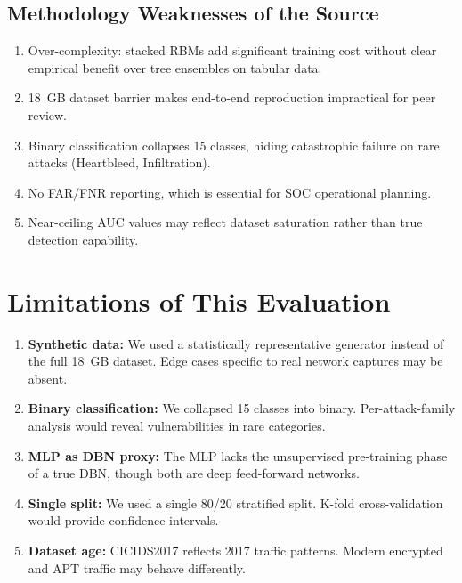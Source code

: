 \documentclass[11pt,a4paper]{article}
\begin{document}
\subsection{Methodology Weaknesses of the Source}
\begin{enumerate}[nosep]
    \item Over-complexity: stacked RBMs add significant training cost without clear empirical benefit over tree ensembles on tabular data.
    \item 18~GB dataset barrier makes end-to-end reproduction impractical for peer review.
    \item Binary classification collapses 15 classes, hiding catastrophic failure on rare attacks (Heartbleed, Infiltration).
    \item No FAR/FNR reporting, which is essential for SOC operational planning.
    \item Near-ceiling AUC values may reflect dataset saturation rather than true detection capability.
\end{enumerate}

\section{Limitations of This Evaluation}

\begin{enumerate}[nosep]
    \item \textbf{Synthetic data:} We used a statistically representative generator instead of the full 18~GB dataset. Edge cases specific to real network captures may be absent.
    \item \textbf{Binary classification:} We collapsed 15 classes into binary. Per-attack-family analysis would reveal vulnerabilities in rare categories.
    \item \textbf{MLP as DBN proxy:} The MLP lacks the unsupervised pre-training phase of a true DBN, though both are deep feed-forward networks.
    \item \textbf{Single split:} We used a single 80/20 stratified split. K-fold cross-validation would provide confidence intervals.
    \item \textbf{Dataset age:} CICIDS2017 reflects 2017 traffic patterns. Modern encrypted and APT traffic may behave differently.
\end{enumerate}
\end{document}
